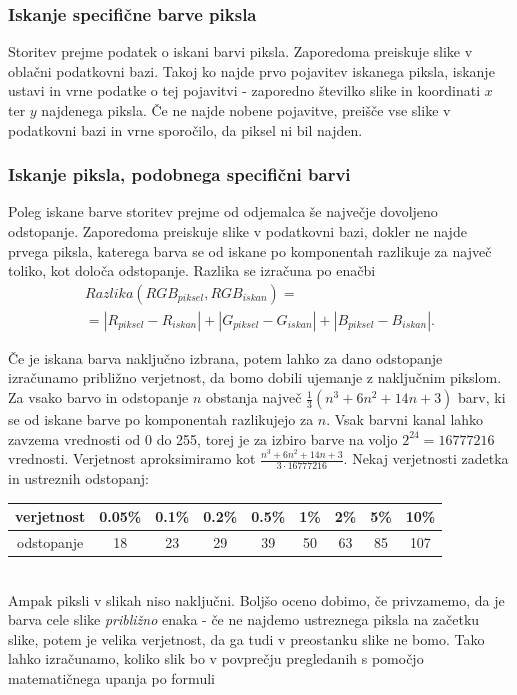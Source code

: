 \subsubsection{Iskanje specifične barve piksla}

Storitev prejme podatek o iskani barvi piksla.
Zaporedoma preiskuje slike v oblačni podatkovni bazi.
Takoj ko najde prvo pojavitev iskanega piksla, iskanje ustavi in vrne podatke o tej pojavitvi - zaporedno številko slike in koordinati $x$ ter $y$ najdenega piksla.
Če ne najde nobene pojavitve, preišče vse slike v podatkovni bazi in vrne sporočilo, da piksel ni bil najden.

\subsubsection{Iskanje piksla, podobnega specifični barvi}

Poleg iskane barve storitev prejme od odjemalca še največje dovoljeno odstopanje.
Zaporedoma preiskuje slike v podatkovni bazi, dokler ne najde prvega piksla, katerega barva se od iskane po komponentah razlikuje za največ toliko, kot določa odstopanje.
Razlika se izračuna po enačbi
\begin{multline} \label{1_eq_odstopanje}
Razlika(RGB_{piksel}, RGB_{iskan}) = \\ = |R_{piksel} - R_{iskan}| + |G_{piksel} - G_{iskan}| + |B_{piksel} - B_{iskan}|.
\end{multline}

Če je iskana barva naključno izbrana, potem lahko za dano odstopanje izračunamo približno verjetnost, da bomo dobili ujemanje z naključnim pikslom.
Za vsako barvo in odstopanje $n$ obstanja največ $\frac{1}{3}(n^3 + 6n^2 + 14n + 3)$ barv, ki se od iskane barve po komponentah razlikujejo za $n$.
Vsak barvni kanal lahko zavzema vrednosti od 0 do 255, torej je za izbiro barve na voljo $2^{24} = 16777216$ vrednosti.
Verjetnost aproksimiramo kot $\frac{n^3 + 6n^2 + 14n + 3}{3 \cdot 16777216}$.
Nekaj verjetnosti zadetka in ustreznih odstopanj: \\ %

\begin{tabular}{c|c c c c c c c c}
verjetnost & 0.05\% & 0.1\% & 0.2\% & 0.5\% & 1\% & 2\% & 5\% & 10\% \\
\hline
odstopanje & 18 & 23 & 29 & 39 & 50 & 63 & 85 & 107
\end{tabular}
\\

Ampak piksli v slikah niso naključni.
Boljšo oceno dobimo, če privzamemo, da je barva cele slike \emph{približno} enaka - če ne najdemo ustreznega piksla na začetku slike, potem je velika verjetnost, da ga tudi v preostanku slike ne bomo.
Tako lahko izračunamo, koliko slik bo v povprečju pregledanih s pomočjo matematičnega upanja po formuli

